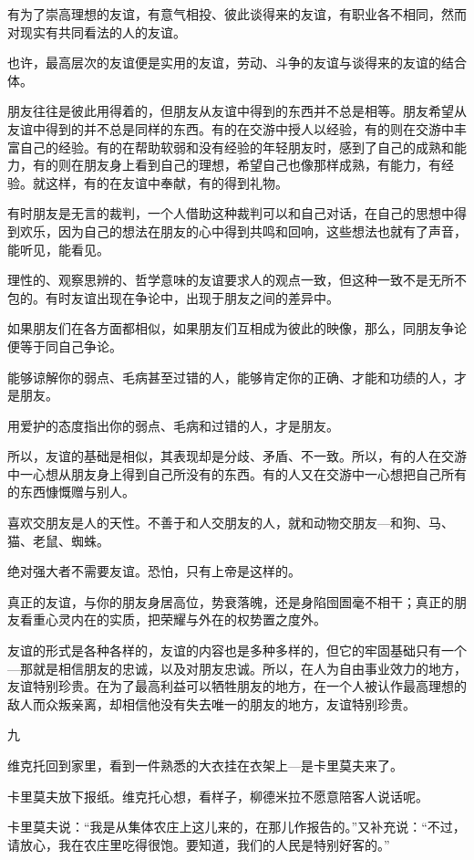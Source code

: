 有为了崇高理想的友谊，有意气相投、彼此谈得来的友谊，有职业各不相同，然而对现实有共同看法的人的友谊。

也许，最高层次的友谊便是实用的友谊，劳动、斗争的友谊与谈得来的友谊的结合体。

朋友往往是彼此用得着的，但朋友从友谊中得到的东西并不总是相等。朋友希望从友谊中得到的并不总是同样的东西。有的在交游中授人以经验，有的则在交游中丰富自己的经验。有的在帮助软弱和没有经验的年轻朋友时，感到了自己的成熟和能力，有的则在朋友身上看到自己的理想，希望自己也像那样成熟，有能力，有经验。就这样，有的在友谊中奉献，有的得到礼物。

有时朋友是无言的裁判，一个人借助这种裁判可以和自己对话，在自己的思想中得到欢乐，因为自己的想法在朋友的心中得到共鸣和回响，这些想法也就有了声音，能听见，能看见。

理性的、观察思辨的、哲学意味的友谊要求人的观点一致，但这种一致不是无所不包的。有时友谊出现在争论中，出现于朋友之间的差异中。

如果朋友们在各方面都相似，如果朋友们互相成为彼此的映像，那么，同朋友争论便等于同自己争论。

能够谅解你的弱点、毛病甚至过错的人，能够肯定你的正确、才能和功绩的人，才是朋友。

用爱护的态度指出你的弱点、毛病和过错的人，才是朋友。

所以，友谊的基础是相似，其表现却是分歧、矛盾、不一致。所以，有的人在交游中一心想从朋友身上得到自己所没有的东西。有的人又在交游中一心想把自己所有的东西慷慨赠与别人。

喜欢交朋友是人的天性。不善于和人交朋友的人，就和动物交朋友—和狗、马、猫、老鼠、蜘蛛。

绝对强大者不需要友谊。恐怕，只有上帝是这样的。

真正的友谊，与你的朋友身居高位，势衰落魄，还是身陷囹圄毫不相干；真正的朋友看重心灵内在的实质，把荣耀与外在的权势置之度外。

友谊的形式是各种各样的，友谊的内容也是多种多样的，但它的牢固基础只有一个—那就是相信朋友的忠诚，以及对朋友忠诚。所以，在人为自由事业效力的地方，友谊特别珍贵。在为了最高利益可以牺牲朋友的地方，在一个人被认作最高理想的敌人而众叛亲离，却相信他没有失去唯一的朋友的地方，友谊特别珍贵。

九

维克托回到家里，看到一件熟悉的大衣挂在衣架上—是卡里莫夫来了。

卡里莫夫放下报纸。维克托心想，看样子，柳德米拉不愿意陪客人说话呢。

卡里莫夫说：“我是从集体农庄上这儿来的，在那儿作报告的。”又补充说：“不过，请放心，我在农庄里吃得很饱。要知道，我们的人民是特别好客的。”

